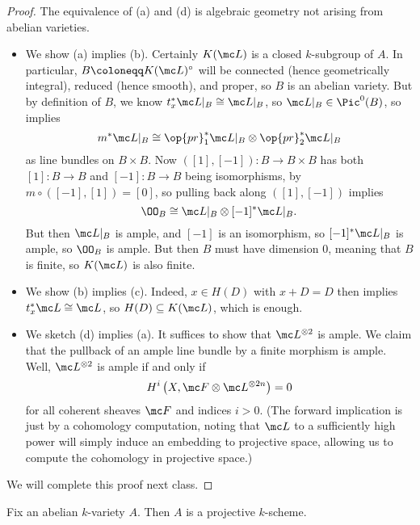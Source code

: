 \documentclass[../notes.tex]{subfiles}
\begin{document}
\begin{proof}
	The equivalence of (a) and (d) is algebraic geometry not arising from abelian varieties.
	\begin{itemize}
		\item We show (a) implies (b). Certainly $K(\mc L)$ is a closed $k$-subgroup of $A$. In particular, $B\coloneqq K(\mc L)^\circ$ will be connected (hence geometrically integral), reduced (hence smooth), and proper, so $B$ is an abelian variety. But by definition of $B$, we know $t_x^*\mc L|_B\cong\mc L|_B$, so $\mc L|_B\in\Pic^0(B)$, so  implies
		\[m^*\mc L|_B\cong\op{pr}_1^*\mc L|_B\otimes\op{pr}_2^*\mc L|_B\]
		as line bundles on $B\times B$. Now $([1],[-1])\colon B\to B\times B$ has both $[1]\colon B\to B$ and $[-1]\colon B\to B$ being isomorphisms, by $m\circ([-1],[1])=[0]$, so pulling back along $([1],[-1])$ implies
		\[\OO_B\cong\mc L|_B\otimes[-1]^*\mc L|_B.\]
		But then $\mc L|_B$ is ample, and $[-1]$ is an isomorphism, so $[-1]^*\mc L|_B$ is ample, so $\OO_B$ is ample. But then $B$ must have dimension $0$, meaning that $B$ is finite, so $K(\mc L)$ is also finite.
		\item We show (b) implies (c). Indeed, $x\in H(D)$ with $x+D=D$ then implies $t_x^*\mc L\cong\mc L$, so $H(D)\subseteq K(\mc L)$, which is enough.
		\item We sketch (d) implies (a). It suffices to show that $\mc L^{\otimes2}$ is ample. We claim that the pullback of an ample line bundle by a finite morphism is ample. Well, $\mc L^{\otimes2}$ is ample if and only if
		\[H^i\left(X,\mc F\otimes\mc L^{\otimes2n}\right)=0\]
		for all coherent sheaves $\mc F$ and indices $i>0$. (The forward implication is just by a cohomology computation, noting that $\mc L$ to a sufficiently high power will simply induce an embedding to projective space, allowing us to compute the cohomology in projective space.)
	\end{itemize}
	We will complete this proof next class.
\end{proof}
\begin{corollary}
	Fix an abelian $k$-variety $A$. Then $A$ is a projective $k$-scheme.
\end{corollary}
\end{document}
